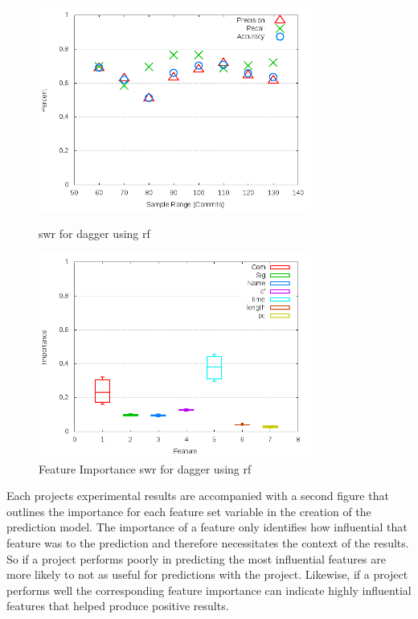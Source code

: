 \begin{figure}[!ht]
    \centering
        \includegraphics[width=0.8\textwidth]{images/rf/test_1/dagger_sample_range}
        \caption{\gls{swr} for dagger using \gls{rf}}
        \label{fig:test_1_dagger_rf}

    \includegraphics[width=0.8\textwidth]{images/rf/test_1/dagger_importance}
        \caption{Feature Importance \gls{swr} for dagger using \gls{rf}}
        \label{fig:test_1_dagger_rf_importance}
\end{figure}

Each projects experimental results are accompanied with a second figure that outlines the importance for each feature set variable in the creation of the prediction model. The importance of a feature only identifies how influential that feature was to the prediction and therefore necessitates the context of the results. So if a project performs poorly in predicting the most influential features are more likely to not as useful for predictions with the project. Likewise, if a project performs well the corresponding feature importance can indicate highly influential features that helped produce positive results.

